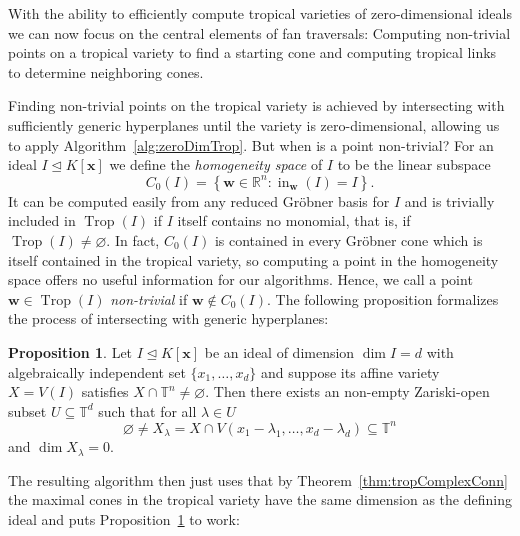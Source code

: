 \documentclass[
  paper=a4,
  titlepage,
  bibliography=totoc,
  pagesize=pdftex
]{scrartcl}
\numberwithin{figure}{section}
\numberwithin{equation}{section}
\numberwithin{table}{section}
\newcommand*\setR{\mathds{R}}
\newcommand*\setT{\mathds{T}}
\let\vec\mathbf
\let\idealof\trianglelefteq
\DeclareMathOperator{\Trop}{Trop}
\DeclareMathOperator{\initial}{in}
\theoremstyle{definition}
\newtheorem{proposition}[definition]{Proposition}
\numberwithin{definition}{section}
\begin{document}
With the ability to efficiently compute tropical varieties of zero-dimensional ideals we
can now focus on the central elements of fan traversals: Computing non-trivial points on a
tropical variety to find a starting cone and computing tropical links to determine
neighboring cones.

Finding non-trivial points on the tropical variety is achieved by intersecting with
sufficiently generic hyperplanes until the variety is zero-dimensional, allowing us to
apply Algorithm~\ref{alg:zeroDimTrop}. But when is a point non-trivial? For an ideal $I
\idealof K[\vec x]$ we define the \emph{homogeneity space} of $I$ to be the linear
subspace
\[
  C_0(I) = \left\{ \vec w \in \setR^n : \initial_{\vec w}(I) = I \right\}.
\]
It can be computed easily from any reduced Gröbner basis for $I$ and is trivially included
in $\Trop(I)$ if $I$ itself contains no monomial, that is, if $\Trop(I) \neq \varnothing$.
In fact, $C_0(I)$ is contained in every Gröbner cone which is itself contained in the
tropical variety, so computing a point in the homogeneity space offers no useful
information for our algorithms. Hence, we call a point $\vec w \in \Trop(I)$
\emph{non-trivial} if $\vec w \not\in C_0(I)$. The following proposition formalizes the
process of intersecting with generic hyperplanes:

\begin{proposition}
  Let $I \idealof K[\vec x]$ be an ideal of dimension $\dim I = d$ with algebraically
  independent set $\{x_1, \dots, x_d\}$ and suppose its affine variety $X = V(I)$
  satisfies $X \cap \setT^n \neq \varnothing$. Then there exists an non-empty Zariski-open
  subset $U \subseteq \setT^d$ such that for all $\lambda \in U$
  \[
    \varnothing \neq X_\lambda =
    X \cap V(x_1-\lambda_1, \dots, x_d - \lambda_d) \subseteq \setT^n
  \]
  and $\dim X_\lambda = 0$.
  \label{prp:intersHyperp}
\end{proposition}

The resulting algorithm then just uses that by Theorem~\ref{thm:tropComplexConn} the
maximal cones in the tropical variety have the same dimension as the defining ideal and
puts Proposition~\ref{prp:intersHyperp} to work:
\end{document}
